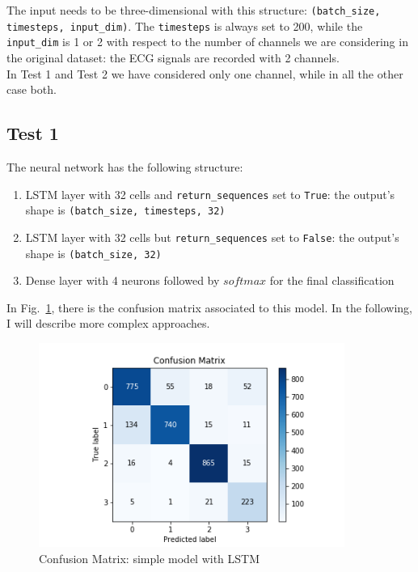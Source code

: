 \documentclass[LaM,binding=0.6cm]{sapthesis}
\begin{document}
The input needs to be three-dimensional with this structure: \texttt{(batch\_size, timesteps, input\_dim)}. The \texttt{timesteps} is always set to 200, while the \texttt{input\_dim} is 1 or 2 with respect to the number of channels we are considering in the original dataset: the ECG signals are recorded with 2 channels.\\In Test 1 and Test 2 we have considered only one channel, while in all the other case both.
\subsection{Test 1}
The neural network has the following structure:
\begin{enumerate}
\item LSTM layer with 32 cells and \texttt{return\_sequences} set to \texttt{True}: the output's shape is \texttt{(batch\_size, timesteps, 32)} 
\item LSTM layer with 32 cells but \texttt{return\_sequences} set to \texttt{False}: the output's shape is \texttt{(batch\_size, 32)} 
\item Dense layer with 4 neurons followed by $softmax$ for the final classification
\end{enumerate}
In Fig.~\ref{fig:lstmt1}, there is the confusion matrix associated to this model. In the following, I will describe more complex approaches.
\begin{figure}[H]  \centering
	\includegraphics[width=100mm,scale=0.7]{lstmt1}
	\caption{Confusion Matrix: simple model with LSTM}
	\label{fig:lstmt1}
\end{figure}
\end{document}
